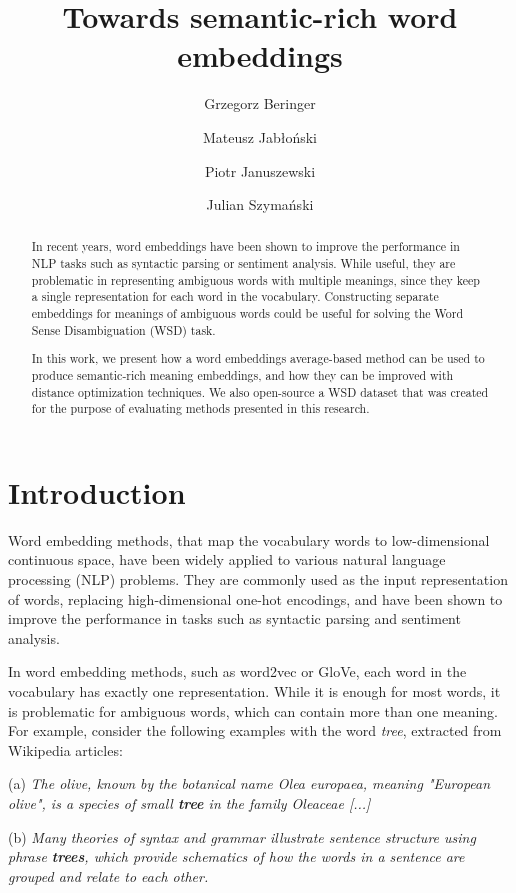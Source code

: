 \documentclass{llncs}
\title{Towards semantic-rich word embeddings}
\author{Grzegorz Beringer \and Mateusz Jabłoński \and Piotr Januszewski \and Julian Szymański}
\institute{
Faculty of Electronic Telecommunications and Informatics\\
Gda{\'n}sk University of Technology, Gda{\'n}sk, Poland
}
\begin{document}
\maketitle
\begin{abstract}

In recent years, word embeddings have been shown to improve the performance in NLP tasks such as syntactic parsing or sentiment analysis.
While useful, they are problematic in representing ambiguous words with multiple meanings, since they keep a single representation for each word in the vocabulary.
Constructing separate embeddings for meanings of ambiguous words could be useful for solving the Word Sense Disambiguation (WSD) task.

In this work, we present how a word embeddings average-based method can be used to produce semantic-rich meaning embeddings, and how they can be improved with distance optimization techniques.
We also open-source a WSD dataset that was created for the purpose of evaluating methods presented in this research.

\end{abstract}

\section{Introduction}
\label{introduction}

Word embedding methods, that map the vocabulary words to low-dimensional continuous space, have been widely applied to various natural language processing (NLP) problems.
They are commonly used as the input representation of words, replacing high-dimensional one-hot encodings, and have been shown to improve the performance in tasks such as syntactic parsing\cite{parsingGrammars} and sentiment analysis\cite{sentimentAnalysis}.

In word embedding methods, such as word2vec\cite{word2vec} or GloVe\cite{GloVe}, each word in the vocabulary has exactly one representation.
While it is enough for most words, it is problematic for ambiguous words, which can contain more than one meaning.
For example, consider the following examples with the word \textit{tree}, extracted from Wikipedia articles:

\medskip
(a) \textit{The olive, known by the botanical name Olea europaea, meaning "European olive", is a species of small \textbf{tree} in the family Oleaceae [...]}

(b) \textit{Many theories of syntax and grammar illustrate sentence structure using phrase \textbf{trees}, which provide schematics of how the words in a sentence are grouped and relate to each other.}
\end{document}
